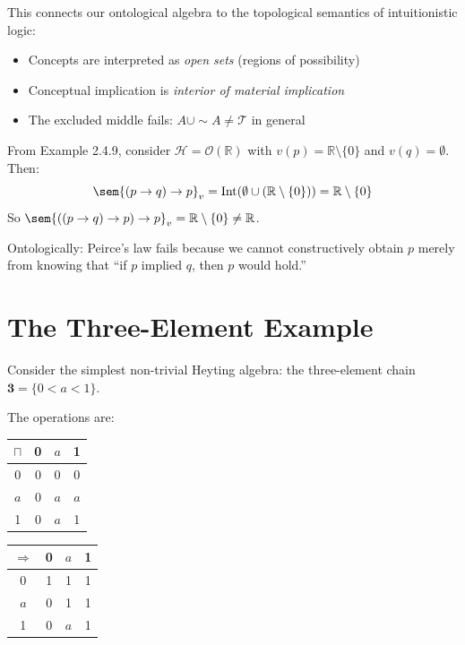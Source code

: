 \documentclass{itt-lean}
\begin{document}
This connects our ontological algebra to the topological semantics of intuitionistic logic:
\begin{itemize}
	\item Concepts are interpreted as \emph{open sets} (regions of possibility)
	\item Conceptual implication is \emph{interior of material implication}
	\item The excluded middle fails: $A \cup \sim A \neq \mathcal{T}$ in general
\end{itemize}

\begin{exemplo}
	From Example 2.4.9, consider $\mathcal{H} = \mathcal{O}(\mathbb{R})$ with $v(p) = \mathbb{R} \setminus \{0\}$ and $v(q) = \emptyset$. Then:
	$$
	\sem{(p \to q) \to p}_v = \mathrm{Int}(\emptyset \cup (\mathbb{R} \setminus \{0\})) = \mathbb{R} \setminus \{0\}
	$$
	So $\sem{((p \to q) \to p) \to p}_v = \mathbb{R} \setminus \{0\} \neq \mathbb{R}$.
	
	Ontologically: Peirce's law fails because we cannot constructively obtain $p$ merely from knowing that ``if $p$ implied $q$, then $p$ would hold.''
\end{exemplo}

\section{The Three-Element Example}

Consider the simplest non-trivial Heyting algebra: the three-element chain $\mathbf{3} = \{0 < a < 1\}$.

\begin{center}
	\heytingtres
\end{center}

The operations are:
\begin{center}
	\begin{tabular}{c|ccc}
		$\sqcap$ & 0 & $a$ & 1 \\
		\hline
		0 & 0 & 0 & 0 \\
		$a$ & 0 & $a$ & $a$ \\
		1 & 0 & $a$ & 1
	\end{tabular}
	\quad
	\begin{tabular}{c|ccc}
		$\Rightarrow$ & 0 & $a$ & 1 \\
		\hline
		0 & 1 & 1 & 1 \\
		$a$ & 0 & 1 & 1 \\
		1 & 0 & $a$ & 1
	\end{tabular}
\end{center}
\end{document}
